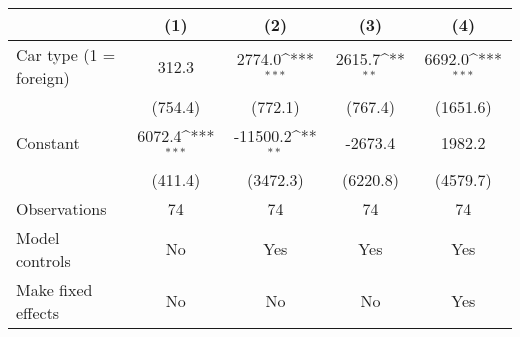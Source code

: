 {
\def\sym#1{\ifmmode^{#1}\else\(^{#1}\)\fi}
\begin{tabular}{l*{4}{c}}
\hline\hline
                &\multicolumn{1}{c}{(1)}         &\multicolumn{1}{c}{(2)}         &\multicolumn{1}{c}{(3)}         &\multicolumn{1}{c}{(4)}         \\
\hline
Car type (1 = foreign)&    312.3         &   2774.0\sym{***}&   2615.7\sym{**} &   6692.0\sym{***}\\
                &  (754.4)         &  (772.1)         &  (767.4)         & (1651.6)         \\
[1em]
Constant        &   6072.4\sym{***}& -11500.2\sym{**} &  -2673.4         &   1982.2         \\
                &  (411.4)         & (3472.3)         & (6220.8)         & (4579.7)         \\
\hline
Observations    &       74         &       74         &       74         &       74         \\
Model controls  &       No         &      Yes         &      Yes         &      Yes         \\
Make fixed effects&       No         &       No         &       No         &      Yes         \\
\hline\hline \end{tabular}} \begin{tablenotes} \footnotesize \item \lipsum[1] \end{tablenotes}
